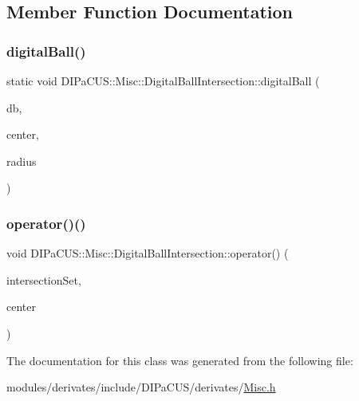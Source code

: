 \subsection{Member Function Documentation}
\mbox{\label{classDIPaCUS_1_1Misc_1_1DigitalBallIntersection_afa60d40e425368adaf396d7a1a71242f}} 
\subsubsection{\texorpdfstring{digital\+Ball()}{digitalBall()}}
{\footnotesize\ttfamily static void D\+I\+Pa\+C\+U\+S\+::\+Misc\+::\+Digital\+Ball\+Intersection\+::digital\+Ball (\begin{DoxyParamCaption}\item[{\mbox{\hyperlink{classDIPaCUS_1_1Misc_1_1DigitalBallIntersection_aaed19d165964a423d69f19a3de0d5587}{Digital\+Set}} \&}]{db,  }\item[{\mbox{\hyperlink{classDIPaCUS_1_1Misc_1_1DigitalBallIntersection_a7e348073cb818df2e225d22746e1d6af}{Point}}}]{center,  }\item[{int}]{radius }\end{DoxyParamCaption})\hspace{0.3cm}{\ttfamily [static]}}

\mbox{\label{classDIPaCUS_1_1Misc_1_1DigitalBallIntersection_aa7e9ee375a80f5746cfc066666b0615d}} 
\subsubsection{\texorpdfstring{operator()()}{operator()()}}
{\footnotesize\ttfamily void D\+I\+Pa\+C\+U\+S\+::\+Misc\+::\+Digital\+Ball\+Intersection\+::operator() (\begin{DoxyParamCaption}\item[{\mbox{\hyperlink{classDIPaCUS_1_1Misc_1_1DigitalBallIntersection_aaed19d165964a423d69f19a3de0d5587}{Digital\+Set}} \&}]{intersection\+Set,  }\item[{\mbox{\hyperlink{classDIPaCUS_1_1Misc_1_1DigitalBallIntersection_a7e348073cb818df2e225d22746e1d6af}{Point}}}]{center }\end{DoxyParamCaption})}



The documentation for this class was generated from the following file\+:\begin{DoxyCompactItemize}
\item 
modules/derivates/include/\+D\+I\+Pa\+C\+U\+S/derivates/\mbox{\hyperlink{Misc_8h}{Misc.\+h}}\end{DoxyCompactItemize}
